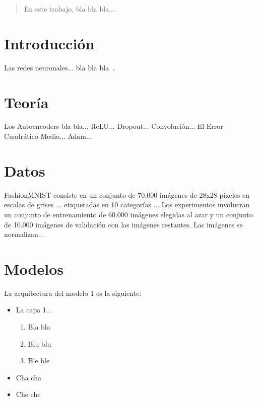 \documentclass[aps,prl,twocolumn,groupedaddress]{revtex4-2}
\begin{document}
\begin{abstract}
En este trabajo, bla bla bla...
\end{abstract}


\maketitle

\section{Introducción}

Las redes neuronales... bla bla bla~\cite{hertz1999introduction}.

\section{Teoría}

Los Autoencoders bla bla...
ReLU...
Dropout...
Convolución...
El Error Cuadrático Medio...
Adam...

\section{Datos}

FashionMNIST consiste en un conjunto de 70.000 imágenes de 28x28 píxeles en escalas de grises ... etiquetadas en 10 categorías ...
Los experimentos involucran un conjunto de entrenamiento de 60.000 imágenes elegidas al azar y un conjunto de 10.000 imágenes de validación con las imágenes restantes.
Las imágenes se normalizan...

\section{Modelos}

La arquitectura del modelo 1 es la siguiente:
\begin{itemize}
    \item La capa 1...
    \begin{enumerate}
        \item Bla bla
        \item Blu blu
        \item Ble ble
    \end{enumerate}
    \item Cha cha
    \item Che che
\end{itemize}
\end{document}
